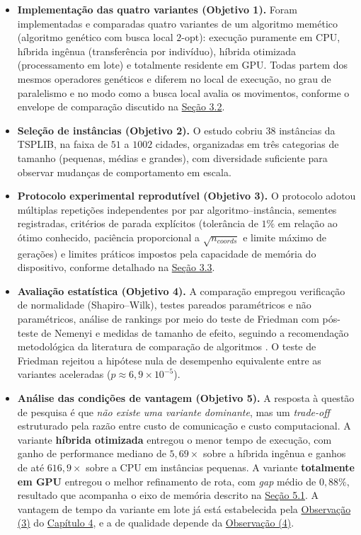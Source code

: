 \begin{itemize}
    \tightlist
    \item
          \textbf{Implementação das quatro variantes (Objetivo 1).} Foram implementadas e comparadas quatro variantes de um algoritmo memético (algoritmo genético com busca local \(2\)-opt): execução puramente em CPU, híbrida ingênua (transferência por indivíduo), híbrida otimizada (processamento em lote) e totalmente residente em GPU.
          Todas partem dos mesmos operadores genéticos e diferem no local de execução, no grau de paralelismo e no modo como a busca local avalia os movimentos, conforme o envelope de comparação discutido na \hyperref[sec-32-arquitetura-variantes]{Seção 3.2}.
    \item
          \textbf{Seleção de instâncias (Objetivo 2).} O estudo cobriu \(38\) instâncias da TSPLIB, na faixa de \(51\) a \(1002\) cidades, organizadas em três categorias de tamanho (pequenas, médias e grandes), com diversidade suficiente para observar mudanças de comportamento em escala.
    \item
          \textbf{Protocolo experimental reprodutível (Objetivo 3).} O protocolo adotou múltiplas repetições independentes por par algoritmo--instância, sementes registradas, critérios de parada explícitos (tolerância de \(1\%\) em relação ao ótimo conhecido, paciência proporcional a \(\sqrt{n_{coords}}\) e limite máximo de gerações) e limites práticos impostos pela capacidade de memória do dispositivo, conforme detalhado na \hyperref[sec-33-selecao-instancias]{Seção 3.3}.
    \item
          \textbf{Avaliação estatística (Objetivo 4).} A comparação empregou verificação de normalidade (Shapiro--Wilk), testes pareados paramétricos e não paramétricos, análise de rankings por meio do teste de Friedman com pós-teste de Nemenyi e medidas de tamanho de efeito, seguindo a recomendação metodológica da literatura de comparação de algoritmos \autocite{demsar2006statistical}.
          O teste de Friedman rejeitou a hipótese nula de desempenho equivalente entre as variantes aceleradas
          (\(p \approx 6{,}9 \times 10^{-5}\)).
    \item
          \textbf{Análise das condições de vantagem (Objetivo 5).} A resposta à questão de pesquisa é que \emph{não existe uma variante dominante}, mas um \emph{trade-off} estruturado pela razão entre custo de comunicação e custo computacional.
          A variante \textbf{híbrida otimizada} entregou o menor tempo de execução, com ganho de performance mediano de \(5{,}69\times\) sobre a híbrida ingênua e ganhos de até \(616{,}9\times\) sobre a CPU em instâncias pequenas.
          A variante \textbf{totalmente em GPU} entregou o melhor refinamento de rota, com \emph{gap} médio de \(0{,}88\%\), resultado que acompanha o eixo de memória descrito na \hyperref[sec-51-sintese-achados]{Seção 5.1}.
          A vantagem de tempo da variante em lote já está estabelecida pela \hyperref[obs-aritmetica]{Observação (3)} do \hyperref[cap4-resultados]{Capítulo 4}, e a de qualidade depende da \hyperref[obs-erro-iteracoes]{Observação (4)}.
\end{itemize}

